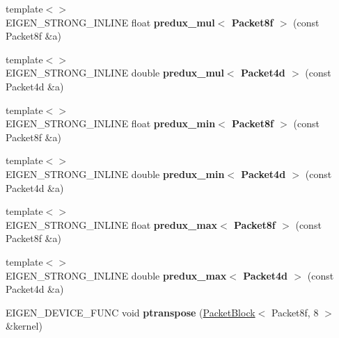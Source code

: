 \begin{DoxyCompactItemize}
{\footnotesize template$<$$>$ }\\E\+I\+G\+E\+N\+\_\+\+S\+T\+R\+O\+N\+G\+\_\+\+I\+N\+L\+I\+NE float {\bfseries predux\+\_\+mul$<$ Packet8f $>$} (const Packet8f \&a)
\item 
\mbox{\label{namespace_eigen_1_1internal_ae50c6d264108ba868c3494589f12c838}} 
{\footnotesize template$<$$>$ }\\E\+I\+G\+E\+N\+\_\+\+S\+T\+R\+O\+N\+G\+\_\+\+I\+N\+L\+I\+NE double {\bfseries predux\+\_\+mul$<$ Packet4d $>$} (const Packet4d \&a)
\item 
\mbox{\label{namespace_eigen_1_1internal_a3c0be819d1b12a92ffa63ecb665ac58f}} 
{\footnotesize template$<$$>$ }\\E\+I\+G\+E\+N\+\_\+\+S\+T\+R\+O\+N\+G\+\_\+\+I\+N\+L\+I\+NE float {\bfseries predux\+\_\+min$<$ Packet8f $>$} (const Packet8f \&a)
\item 
\mbox{\label{namespace_eigen_1_1internal_a74f6927abda2c407a71c52f226e13841}} 
{\footnotesize template$<$$>$ }\\E\+I\+G\+E\+N\+\_\+\+S\+T\+R\+O\+N\+G\+\_\+\+I\+N\+L\+I\+NE double {\bfseries predux\+\_\+min$<$ Packet4d $>$} (const Packet4d \&a)
\item 
\mbox{\label{namespace_eigen_1_1internal_a98afc052d11b426571d32c6325e43e17}} 
{\footnotesize template$<$$>$ }\\E\+I\+G\+E\+N\+\_\+\+S\+T\+R\+O\+N\+G\+\_\+\+I\+N\+L\+I\+NE float {\bfseries predux\+\_\+max$<$ Packet8f $>$} (const Packet8f \&a)
\item 
\mbox{\label{namespace_eigen_1_1internal_a7bf5634fea49731b7f9602af60722d28}} 
{\footnotesize template$<$$>$ }\\E\+I\+G\+E\+N\+\_\+\+S\+T\+R\+O\+N\+G\+\_\+\+I\+N\+L\+I\+NE double {\bfseries predux\+\_\+max$<$ Packet4d $>$} (const Packet4d \&a)
\item 
\mbox{\label{namespace_eigen_1_1internal_a0f731c823bbf618a1f4b979e8a9b3121}} 
E\+I\+G\+E\+N\+\_\+\+D\+E\+V\+I\+C\+E\+\_\+\+F\+U\+NC void {\bfseries ptranspose} (\hyperlink{struct_eigen_1_1internal_1_1_packet_block}{Packet\+Block}$<$ Packet8f, 8 $>$ \&kernel)

\end{DoxyCompactItemize}
